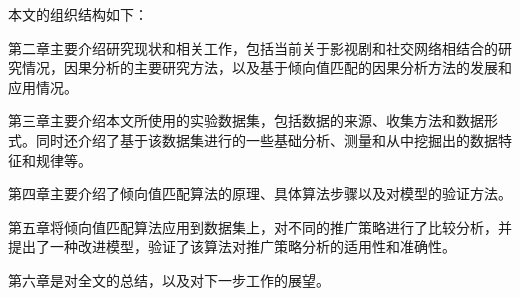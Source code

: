本文的组织结构如下：

第二章主要介绍研究现状和相关工作，包括当前关于影视剧和社交网络相结合的研究情况，因果分析的主要研究方法，以及基于倾向值匹配的因果分析方法的发展和应用情况。

第三章主要介绍本文所使用的实验数据集，包括数据的来源、收集方法和数据形式。同时还介绍了基于该数据集进行的一些基础分析、测量和从中挖掘出的数据特征和规律等。

第四章主要介绍了倾向值匹配算法的原理、具体算法步骤以及对模型的验证方法。

第五章将倾向值匹配算法应用到数据集上，对不同的推广策略进行了比较分析，并提出了一种改进模型，验证了该算法对推广策略分析的适用性和准确性。

第六章是对全文的总结，以及对下一步工作的展望。




































